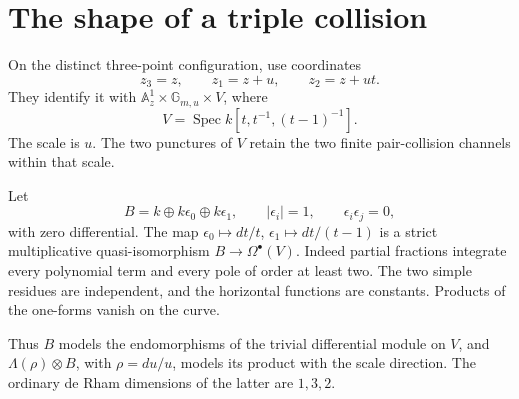 \section{The shape of a triple collision}
\label{cbc:rc:subsec:shape}

On the distinct three-point configuration, use coordinates
\[
 z_3=z,\qquad z_1=z+u,\qquad z_2=z+ut.
\]
They identify it with
\(\mathbb A^1_z\times\mathbb G_{m,u}\times V\), where
\[
 V=\operatorname{Spec}k[t,t^{-1},(t-1)^{-1}].
\]
The scale is \(u\).  The two punctures of \(V\) retain the two finite
pair-collision channels within that scale.

Let
\[
 B=k\oplus k\epsilon_0\oplus k\epsilon_1,
 \qquad |\epsilon_i|=1,
 \qquad \epsilon_i\epsilon_j=0,
\]
with zero differential.  The map
\(\epsilon_0\mapsto dt/t\), \(\epsilon_1\mapsto dt/(t-1)\)
is a strict multiplicative quasi-isomorphism \(B\to\Omega^\bullet(V)\).
Indeed partial fractions integrate every polynomial term and every pole
of order at least two.  The two simple residues are independent, and
the horizontal functions are constants.  Products of the one-forms
vanish on the curve.

Thus \(B\) models the endomorphisms of the trivial differential module
on \(V\), and \(\Lambda(\rho)\otimes B\), with
\(\rho=du/u\), models its product with the scale direction.
The ordinary de Rham dimensions of the latter are \(1,3,2\).

